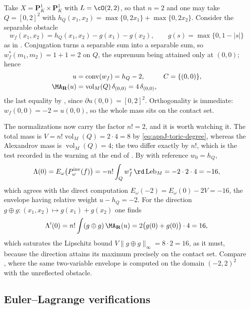\begin{example}
\label{ex:ch27-toric-two-variables}
Take $X=\mathbf P^1_K\times\mathbf P^1_K$ with
$L=\cO(2,2)$, so that $n=2$ and one may take $Q=[0,2]^2$ with
$h_Q(x_1,x_2)=\max\{0,2x_1\}+\max\{0,2x_2\}$.  Consider the separable
obstacle
\[
 w_f(x_1,x_2)=h_Q(x_1,x_2)-g(x_1)-g(x_2),
 \qquad g(s)=\max\{0,1-|s|\}
\]
as in .  Conjugation turns a separable sum into
a separable sum, so
$w_f^*(m_1,m_2)=1+1=2$ on $Q$, the supremum being attained only at
$(0,0)$; hence
\[
 \begin{aligned}
 u&=\operatorname{conv}(w_f)=h_Q-2,
 &C&=\{(0,0)\},\\
 \MA_{\mathbf R}(u)
   &=\operatorname{vol}_M(Q)\,\delta_{(0,0)}
   =4\,\delta_{(0,0)},
 \end{aligned}
\]
the last equality by , since
$\partial u(0,0)=[0,2]^2$.  Orthogonality is immediate:
$w_f(0,0)=-2=u(0,0)$, so the whole mass sits on the contact set.

The normalizations now carry the factor $n!=2$, and it is worth watching
it.  The total mass is
$V=n!\operatorname{vol}_M(Q)=2\cdot4=8$ by
\eqref{eq:appJ-toric-degree}, whereas the Alexandrov mass is
$\operatorname{vol}_M(Q)=4$; the two differ exactly by $n!$, which is
the test recorded in the warning at the end of
.  By  with reference
$w_0=h_Q$,
\[
 \Lambda(0)=E_\omega\bigl(P^{\mathrm{inv}}_\omega(f)\bigr)
 =-n!\int_Qw_f^*\,\rd\operatorname{Leb}_M=-2\cdot2\cdot4=-16 ,
\]
which agrees with the direct computation
$E_\omega(-2)=E_\omega(0)-2V=-16$, the envelope having relative weight
$u-h_Q=-2$.  For the direction
$g\oplus g:(x_1,x_2)\mapsto g(x_1)+g(x_2)$ one finds
\[
 \Lambda'(0)=n!\int(g\oplus g)\,\MA_{\mathbf R}(u)
 =2\bigl(g(0)+g(0)\bigr)\cdot4=16,
\]
which saturates the Lipschitz bound
$V\lVert g\oplus g\rVert_\infty=8\cdot2=16$, as it must, because the
direction attains its maximum precisely on the contact set.  Compare
, where the same two-variable envelope is
computed on the domain $(-2,2)^2$ with the unreflected obstacle.
\end{example}

\subsection{Euler--Lagrange verifications}
\label{sec:ch27-euler-lagrange-numbers}

